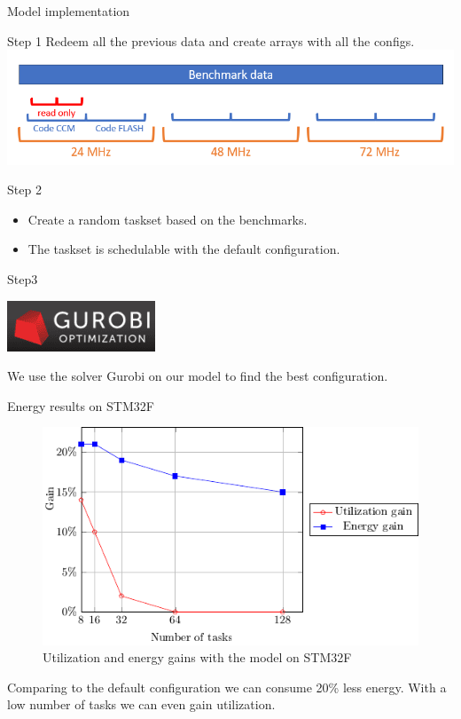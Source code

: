 \documentclass[
	11pt, %
]{beamer}
\begin{document}
\begin{frame}{Model implementation}
	\begin{block}{Step 1}
		Redeem all the previous data and create arrays with all the configs.
		\centering
		\includegraphics[scale=0.5]{images/data.png}
	\end{block}

	\begin{block}{Step 2}
		\begin{itemize}
			\item Create a random taskset based on the benchmarks.
			\item The taskset is schedulable with the default configuration.
		\end{itemize}
		
	\end{block}

	\begin{block}{Step3}
		\begin{minipage}{0.25\textwidth}
			\includegraphics[scale=0.9]{images/gurobi.png}
		\end{minipage}
		\begin{minipage}{0.6\textwidth}
			We use the solver Gurobi on our model to find the best configuration. 
		\end{minipage}
	\end{block}
\end{frame}

\begin{frame}{Energy results on STM32F}
	\begin{figure}
		\includegraphics{data/model/poster.pdf}
		\caption{Utilization and energy gains with the model on STM32F}
	\end{figure}
	Comparing to the default configuration we can consume 20\% less energy. 
	With a low number of tasks we can even gain utilization.
\end{frame}
\end{document}
